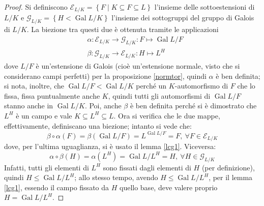 \documentclass[12pt]{scrartcl}
\theoremstyle{style}
\numberwithin{equation}{subsection}
\begin{document}
\begin{proof}
	Si definiscono $\mathcal{E} _{L / K} = \left\{ F  \mid  K\subseteq F \subseteq L \right\} $ l'insieme delle sottoestensioni di $L / K$ e $\mathcal{G} _{L / K} = \left\{ H < \operatorname{Gal} L / K \right\} $ l'insieme dei sottogruppi del gruppo di Galois di $L / K$.
	La biezione tra questi due \`e ottenuta tramite le applicazioni
	\[
	\begin{split}
		&\alpha : \mathcal{E} _{L / K} \longrightarrow \mathcal{G} _{L / K}  : F \longmapsto \operatorname{Gal} L / F\\
		& \beta : \mathcal{G} _{L / K} \longrightarrow \mathcal{E} _{L / K} : H \longmapsto L^H
	\end{split}
	\] 
	dove $L / F$ \`e un'estensione di Galois (cio\`e un'estensione normale, visto che si considerano campi perfetti) per la proposizione \ref{normtor}, quindi $\alpha $ \`e ben definita; si nota, inoltre, che $\operatorname{Gal} L / F < \operatorname{Gal}  L / K$ perch\'e un $K$-automorfismo di $F$ che lo fissa, fissa puntualmente anche $K$, quindi tutti gli automorfismi di $\operatorname{Gal} L / F$ stanno anche in $\operatorname{Gal} L / K$.
Poi, anche $\beta $ \`e ben definita perch\'e si \`e dimostrato che $L^H$ \`e un campo e vale $K \subseteq L^H \subseteq L$.
Ora si verifica che le due mappe, effettivamente, definiscano una biezione; intanto si vede che:
\[
\beta \circ \alpha (F) = \beta \left(\operatorname{Gal} L / F\right) = L^{\operatorname{Gal} L / F} = F, \ \forall F \in \mathcal{E} _{L / K} 
\] 
dove, per l'ultima uguaglianza, si \`e usato il lemma \ref{lcg1}.
Viceversa:
\[
\alpha \circ \beta (H) = \alpha (L^H) = \operatorname{Gal} L / L^H = H , \ \forall H \in \mathcal{G} _{L / K} 
\] 
Infatti, tutti gli elementi di $L^H$ sono fissati dagli elementi di $H$ (per definizione), quindi $H \le \operatorname{Gal} L / L^H$; allo stesso tempo, avendo $H \le \operatorname{Gal} L / L^H$, per il lemma \ref{lcg1}, essendo il campo fissato da $H$ quello base, deve valere proprio $H = \operatorname{Gal} L / L^H$.


\end{proof}
\end{document}
